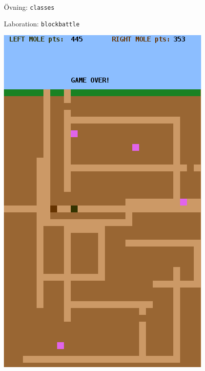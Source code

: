

\ifkompendium\else

\begin{Slide}{Övning: \texttt{classes}}
\begin{itemize}\SlideFontSmall

\end{itemize}
\end{Slide}

\begin{Slide}{Laboration: \texttt{blockbattle}}
\begin{minipage}{0.55\textwidth}
  \setlength{\leftmargini}{0pt}
  \begin{itemize}\SlideFontSmall
  
  \end{itemize}

\end{minipage}
\hfill\begin{minipage}{0.4\textwidth}
\includegraphics[width=\textwidth]{../img/blockbattle}
\end{minipage}
\end{Slide}

\fi
